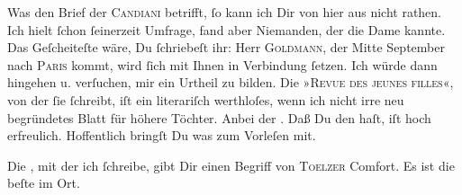 \pstart
           Was den Brief der \textsc{Candiani} betrifft, ſo kann ich Dir von hier aus nicht rathen. Ich hielt ſchon ſeinerzeit
               Umfrage, fand aber Niemanden, der die Dame
               kannte. Das Geſcheiteſte wäre, Du ſchriebeſt ihr: Herr \textsc{Goldmann}, der Mitte September{ }{\pb}nach \textsc{Paris} kommt, wird ſich mit Ihnen in Verbindung ſetzen. Ich würde dann hingehen u.
               verſuchen, mir \label{K_L02743-3v}\label{K_L02743-3} ein
               Urtheil zu bilden. Die »\textsc{Revue des jeunes filles}«, von der ſie ſchreibt, iſt ein literariſch werthloſes, wenn ich nicht irre neu
               begründetes Blatt\strikeout{\textcolor{gray}{e}} für höhere Töchter. Anbei der \label{K_L02743-4v}\label{K_L02743-4}.
                  {\pb}Daß Du den \label{K_L02743-5v}\label{K_L02743-5} haſt, iſt hoch erfreulich. Hoffentlich bringſt Du was zum Vorleſen mit.\pend
           
\pstart
           Die \label{K_L02743-6v}\label{K_L02743-6}, mit
               der ich ſchreibe, gibt Dir einen Begriff von \textsc{Toelzer} Comfort. Es ist die beſte im
               Ort.\pend
           
